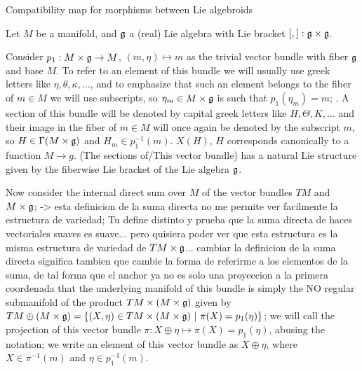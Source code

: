 Compatibility map for morphisms between Lie algebroids

Let $M$ be a manifold, and $\mathfrak{g}$ a (real) Lie algebra with Lie bracket $[,]: \mathfrak{g} \times \mathfrak{g}$. 

Consider $p_1: M \times \mathfrak{g} \to M$, $(m, \eta) \mapsto m$ as the trivial vector bundle with fiber $\mathfrak{g}$ and base $M$. To refer to an element of this bundle we will usually use greek letters like $\eta, \theta, \kappa, \dots$, and to emphasize that such an element belongs to the fiber of $m \in M$ we will use subscripts, so $\eta_m \in M \times \mathfrak{g}$ is such that $p_1(\eta_m) = m$; . A section of this bundle will be denoted by capital greek letters like $H, \Theta, K, \dots$ and their image in the fiber of $m \in M$ will once again be denoted by the subscript $m$, so $H \in \Gamma(M \times \mathfrak{g})$ and $H_m \in p_1^{-1}(m)$. $X(H)$, $H$ corresponds canonically to a function $M \to g$. (The sections of/This vector bundle) has a natural Lie structure given by the fiberwise Lie bracket of the Lie algebra $\mathfrak{g}$.

Now consider the internal direct sum over $M$ of the vector bundles $TM$ and $M \times \mathfrak{g}$; -> esta definicion de la suma directa no me permite ver facilmente la estructura de variedad; Tu define distinto y prueba que la suma directa de haces vectoriales suaves es suave... pero quisiera poder ver que esta estructura es la misma estructura de variedad de $TM \times \mathfrak{g}$... cambiar la definicion de la suma directa significa tambien que cambie la forma de referirme a los elementos de la suma, de tal forma que el anchor ya no es solo una proyeccion a la primera coordenada  that the underlying manifold of this bundle is simply the NO regular submanifold of the product $TM \times (M \times \mathfrak{g})$ given by $TM \oplus (M \times \mathfrak{g}) = \left\{ (X, \eta) \in TM \times (M \times \mathfrak{g}) \ |\  \pi(X) = p_1(\eta) \right\}$; we will call the projection of this vector bundle $\pi: X \oplus \eta \mapsto \pi(X) = p_1(\eta)$, abusing the notation; we write an element of this vector bundle as $X \oplus \eta$, where $X \in \pi^{-1}(m)$ and $\eta \in p_1^{-1}(m)$.

